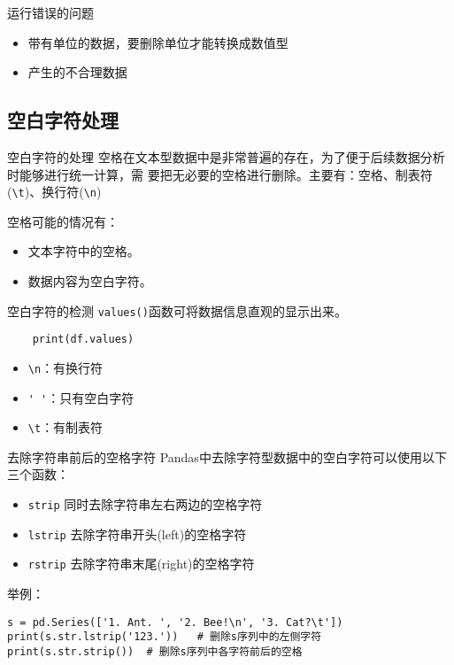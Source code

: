 \documentclass[t]{beamer}
\begin{document}
\begin{frame}[fragile]{运行错误的问题}
\begin{itemize}
    \item 带有单位的数据，要删除单位才能转换成数值型
    \item 产生的不合理数据
\end{itemize}
\end{frame}


\subsection{空白字符处理}
\begin{frame}[fragile]{空白字符的处理}
    空格在文本型数据中是非常普遍的存在，为了便于后续数据分析时能够进行统一计算，需
    要把无必要的空格进行删除。主要有：空格、制表符(\verb|\t|)、换行符(\verb|\n|)

    空格可能的情况有：
\begin{itemize}
    \item 文本字符中的空格。
    \item 数据内容为空白字符。
\end{itemize}
\end{frame}


\begin{frame}[fragile]{空白字符的检测}
    \verb|values()|函数可将数据信息直观的显示出来。
\begin{lstlisting}
    print(df.values)
\end{lstlisting}

\begin{itemize}
    \item \verb|\n|：有换行符
    \item \verb|' '|：只有空白字符
    \item \verb|\t|：有制表符
\end{itemize}
\end{frame}


\begin{frame}[fragile]{去除字符串前后的空格字符}
    Pandas中去除字符型数据中的空白字符可以使用以下三个函数：
\begin{itemize}
    \item \verb|strip| 同时去除字符串左右两边的空格字符
    \item \verb|lstrip| 去除字符串开头(left)的空格字符
    \item \verb|rstrip| 去除字符串末尾(right)的空格字符
\end{itemize}

\begin{block}{举例：}
\begin{lstlisting}
s = pd.Series(['1. Ant. ', '2. Bee!\n', '3. Cat?\t'])
print(s.str.lstrip('123.'))   # 删除s序列中的左侧字符
print(s.str.strip())  # 删除s序列中各字符前后的空格
\end{lstlisting}
\end{block}
\end{frame}
\end{document}
